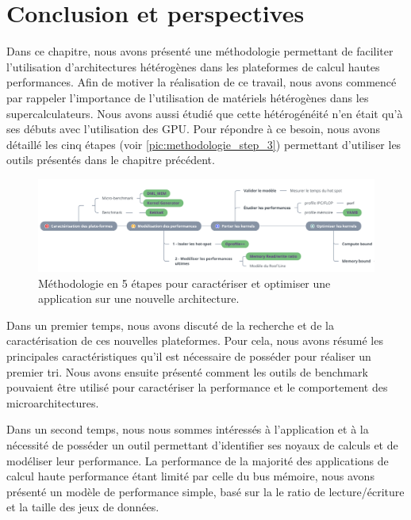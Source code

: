 \section{Conclusion et perspectives}\label{sec:methodo_conclusion}

    
    Dans ce chapitre, nous avons présenté une méthodologie permettant de faciliter l'utilisation d'architectures hétérogènes dans les plateformes de calcul hautes performances. Afin de motiver la réalisation de ce travail, nous avons commencé par rappeler l'importance de l'utilisation de matériels hétérogènes dans les supercalculateurs. Nous avons aussi étudié que cette hétérogénéité n'en était qu'à ses débuts avec l'utilisation des GPU. Pour répondre à ce besoin, nous avons détaillé les cinq étapes (voir \autoref{pic:methodologie_step_3}) permettant d'utiliser les outils présentés dans le chapitre précédent.
    
    \begin{figure}[h!]
    \center
    \includegraphics[width=17cm]{images/methodologie_step.png}
    \caption{\label{pic:methodologie_step_3} Méthodologie en 5 étapes pour caractériser et optimiser une application sur une nouvelle architecture.}    \end{figure}
    
    
    Dans un premier temps, nous avons discuté de la recherche et de la caractérisation de ces nouvelles plateformes. Pour cela, nous avons résumé les principales caractéristiques qu'il est nécessaire de posséder pour réaliser un premier tri. Nous avons ensuite présenté comment les outils de benchmark pouvaient être utilisé pour caractériser la performance et le comportement des microarchitectures.
    
    Dans un second temps, nous nous sommes intéressés à l'application et à la nécessité de posséder un outil permettant d'identifier ses noyaux de calculs et de modéliser leur performance. La performance de la majorité des applications de calcul haute performance étant limité par celle du bus mémoire, nous avons présenté un modèle de performance simple, basé sur la le ratio de lecture/écriture et la taille des jeux de données. 
    

